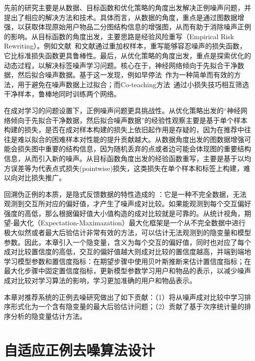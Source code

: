 先前的研究主要是从数据、目标函数和优化策略的角度出发解决正例噪声问题，并提出了相应的解决方法和技术。具体而言，从数据的角度，重点是通过图数据增强\cite{pmlr-v119-zheng20d,10.1145/3437963.3441734,10.1145/3437963.3441720,page1998pagerank}，以获取体现原始用户物品二分图结构信息的增强图，从而有助于消除噪声正例的影响。从目标函数的角度出发，主要思路是经验风险重写（Empirical Risk Rewriting）。例如文献~\cite{liu2015classification}和文献\cite{xia:2019:NIPS}通过重加权样本，重写能够容忍噪声的损失函数，它比标准损失函数更具鲁棒性。最后，从优化策略的角度出发，重点是探索优化的动态过程，以解决标签噪声学习问题。核心在于，神经网络倾向于先拟合干净数据，然后拟合噪声数据\cite{zhang2021understanding}。基于这一发现，例如早停法~\cite{li2020gradient}作为一种简单而有效的方法，用于避免在噪声数据上过拟合；而Co-teaching方法~\cite{Han:2018:NIPS}通过小损失技巧相互筛选干净样本，鲁棒地同时训练两个网络。

在成对学习的问题设置下，正例噪声问题更具挑战性。从优化策略出发的“神经网络倾向于先拟合干净数据，然后拟合噪声数据”的经验性观察主要是基于单个样本构建的损失，是否在成对样本构建的损失上依旧起作用是存疑的，因为在推荐中往往是难以拟合的困难样本对性能的提升贡献越大\cite{Steffen:2014:WSDM}。从数据角度出发的图数据增强可能会损失图中重要的结构信息，因为随机丢弃的点或者边可能会体现图的重要结构信息，从而引入新的噪声。从目标函数角度出发的经验函数重写，主要是基于以均方误差等为代表点式损失(pointwise)损失，这类损失在单个样本和标签上构建，难以向对比损失推广。

回溯伪正例的本质，是隐式反馈数据的特性造成的
：它是一种不完全数据，无法观测到交互所对应的偏好值，才产生了噪声成对比较。如果能观测到每个交互偏好强度的高低，那么根据偏好值大小值构造的成对比较就是可靠的。从统计视角，期望-最大化（Expectation-Maximazation）最大化框架是一个从不完全数据中进行极大似然或者最大后验估计非常有效的方法，可以估计无法观测到的隐变量和模型参数。因此，本章引入一个隐变量，含义为每个交互的偏好值，同时也对应了每个成对比较置信度的高低，交互的偏好值越大则成对比较的置信度越高，并端到端地学习模型参数和置信度指标：在期望步骤中使用贝叶斯推断来估计置信度指标；在最大化步骤中固定置信度指标，更新模型参数学习用户和物品的表示，以减少噪声成对比较对学习算法的影响，学习更加准确的用户和物品表示。

本章对推荐系统的正例去噪研究做出了如下贡献：（1）将从噪声成对比较中学习排序形式化为一个含有隐变量的最大后验估计问题；（2）贡献了基于次序统计量的排序分析的隐变量估计方法。

\section{自适应正例去噪算法设计}

